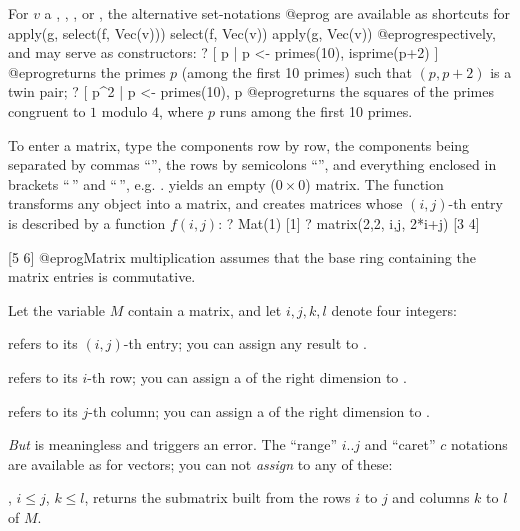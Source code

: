  For $v$ a , , ,
  or , the alternative set-notations
 \bprog
 [g(x) | x <- v, f(x)]
 [x | x <- v, f(x)]
 [g(x) | x <- v]
 @eprog\noindent
 are available as shortcuts for
 \bprog
 apply(g, select(f, Vec(v)))
 select(f, Vec(v))
 apply(g, Vec(v))
 @eprog\noindent respectively, and may serve as  constructors:
 \bprog
 ? [ p | p <- primes(10), isprime(p+2) ]
 @eprog\noindent returns the primes $p$ (among the first 10 primes) such
 that $(p, p+2)$ is a twin pair;
 \bprog
 ? [ p^2 | p <- primes(10), p %
 @eprog\noindent returns the squares of the primes congruent to $1$ modulo $4$,
 where $p$ runs among the first 10 primes.

%
To enter a matrix, type the components row by row, the components being
separated by commas ``\kbd{,}'', the rows by semicolons ``\kbd{;}'', and
everything enclosed in brackets ``\kbd{[}$\,$'' and ``$\,$\kbd{]}'', e.g.
\kbd{[x,y; z,t; u,v]}. \kbd{[;]} yields an empty ($0 \times 0$) matrix. The
function  transforms any object into a matrix, and 
creates matrices whose $(i,j)$-th entry is described by a function $f(i,j)$:
\bprog
? Mat(1)
[1]
? matrix(2,2, i,j, 2*i+j)
[3 4]

[5 6]
@eprog\noindent Matrix multiplication assumes that the base ring containing
the matrix entries is commutative.

\noindent Let the variable $M$ contain a matrix, and let $i,j,k,l$ denote
four
integers:

\item {} refers to its $(i,j)$-th entry; you can assign any result
to .

\item {} refers to its $i$-th row; you can assign a 
of the right dimension to .

\item {} refers to its $j$-th column; you can assign a 
of the right dimension to .

\noindent \emph{But}  is meaningless and triggers an error. The
``range'' $i..j$ and ``caret'' \kbd{\pow}$c$ notations are available as for
vectors; you can not \emph{assign} to any of these:

\item {}, $i\leq j$, $k\leq l$, returns the submatrix built
from the rows $i$ to $j$ and columns $k$ to $l$ of $M$.

